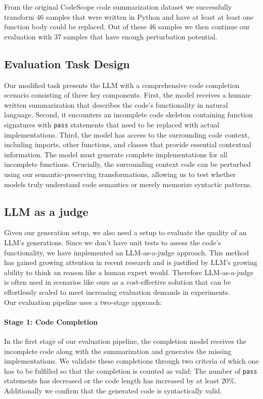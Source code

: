 \documentclass[%
thesis=student,%
coverpage=false,%
titlepage=false,%
headmarks=true, %
english,%
font=libertine, %
math=newpxtx, %
BCOR=5mm,%
coverBCOR=11mm%
]{tum-templates/book/tumbook}
\begin{document}
From the original CodeScope code summarization dataset we successfully transform 46 samples that were written in Python and have at least at least one function body could be replaced. Out of these 46 samples we then continue our evaluation with 37 samples that have enough perturbation potential.

\subsection{Evaluation Task Design}
Our modified task presents the LLM with a comprehensive code completion scenario consisting of three key components. First, the model receives a human-written summarization that describes the code's functionality in natural language. Second, it encounters an incomplete code skeleton containing function signatures with \texttt{pass} statements that need to be replaced with actual implementations. Third, the model has access to the surrounding code context, including imports, other functions, and classes that provide essential contextual information. 
The model must generate complete implementations for all incomplete functions. Crucially, the surrounding context code can be perturbed using our semantic-preserving transformations, allowing us to test whether models truly understand code semantics or merely memorize syntactic patterns.


\subsection{LLM as a judge}
Given our generation setup, we also need a setup to evaluate the quality of an LLM's generations. Since we don't have unit tests to assess the code's functionality, we have implemented an LLM-as-a-judge approach. This method has gained growing attention in recent research \cite{Zheng2023, GU2025} and is justified by LLM's growing ability to think an reason like a human expert would. Therefore LLM-as-a-judge is often used in scenarios like ours as a cost-effective solution that can be effortlessly scaled to meet increasing evaluation demands in experiments. \\

Our evaluation pipeline uses a two-stage approach:
\paragraph{Stage 1: Code Completion}
In the first stage of our evaluation pipeline, the completion model receives the incomplete code along with the summarization and generates the missing implementations. We validate these completions through two criteria of which one has to be fulfilled so that the completion is counted as valid: The number of \texttt{pass} statements has decreased or the code length has increased by at least 20\%. Additionally we confirm that the generated code is syntactically valid.
\end{document}
